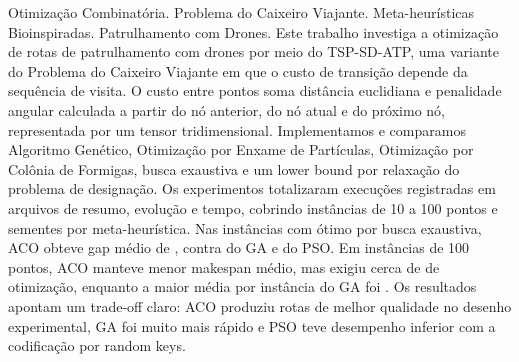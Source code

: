 \documentclass[monografia]{ppgco}
\begin{document}
\pretextual

\maketitle






\begin{resumo}{Otimização Combinatória. Problema do Caixeiro Viajante. Meta-heurísticas Bioinspiradas. Patrulhamento com Drones.}
Este trabalho investiga a otimização de rotas de patrulhamento com drones por meio do TSP-SD-ATP, uma variante do Problema do Caixeiro Viajante em que o custo de transição depende da sequência de visita. O custo entre pontos soma distância euclidiana e penalidade angular calculada a partir do nó anterior, do nó atual e do próximo nó, representada por um tensor tridimensional. Implementamos e comparamos Algoritmo Genético, Otimização por Enxame de Partículas, Otimização por Colônia de Formigas, busca exaustiva e um lower bound por relaxação do problema de designação. Os experimentos totalizaram \TotalExecucoes{} execuções registradas em arquivos de resumo, evolução e tempo, cobrindo \TotalInstancias{} instâncias de 10 a 100 pontos e \TotalSementesGA{} sementes por meta-heurística. Nas \TotalInstanciasComOtimo{} instâncias com ótimo por busca exaustiva, ACO obteve gap médio de \GapMedioOtimoACO{}, contra \GapMedioOtimoGA{} do GA e \GapMedioOtimoPSO{} do PSO. Em instâncias de 100 pontos, ACO manteve menor makespan médio, mas exigiu cerca de \TempoOtimizacaoACOCemMedioSegundos{} de otimização, enquanto a maior média por instância do GA foi \TempoOtimizacaoGAMaxCemMs{}. Os resultados apontam um trade-off claro: ACO produziu rotas de melhor qualidade no desenho experimental, GA foi muito mais rápido e PSO teve desempenho inferior com a codificação por random keys.
\end{resumo}
\end{document}
